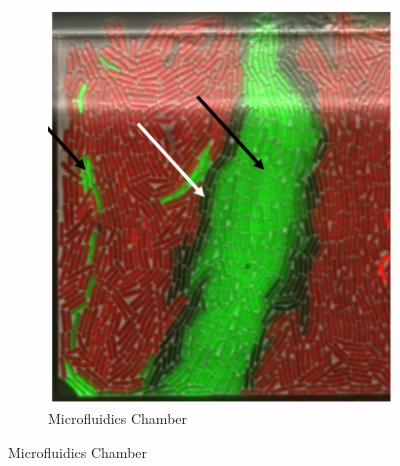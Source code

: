 \documentclass[11pt,a4paper]{article}
\begin{document}
\begin{figure}[H]
\begin{subfigure}[b]{0.45\textwidth}
        \includegraphics[width=\textwidth]{../figures/nonMonReal.png}
        \caption{Microfluidics Chamber}
        \label{fig:mono_dec_real}
    \end{subfigure}
    \label{fig:mono_dec_comparison} 
\end{figure}
\end{document}
